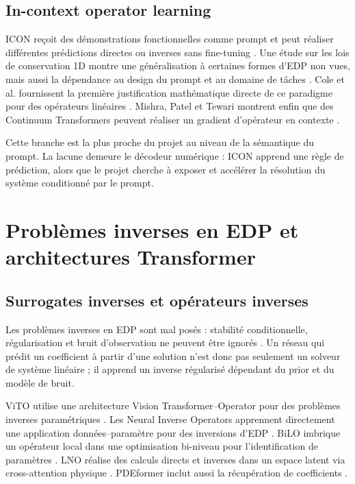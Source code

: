 \documentclass[11pt,a4paper]{article}
\begin{document}
\subsection{In-context operator learning}

ICON reçoit des démonstrations fonctionnelles comme prompt et peut réaliser
différentes prédictions directes ou inverses sans fine-tuning
\cite{yang2023icon}. Une étude sur les lois de conservation 1D montre une
généralisation à certaines formes d'EDP non vues, mais aussi la dépendance au
design du prompt et au domaine de tâches \cite{yang2024icongeneralization}.
Cole et al. fournissent la première justification mathématique directe de ce
paradigme pour des opérateurs linéaires \cite{cole2025systems}. Mishra, Patel et
Tewari montrent enfin que des Continuum Transformers peuvent réaliser un
gradient d'opérateur en contexte \cite{mishra2025continuum}.

Cette branche est la plus proche du projet au niveau de la sémantique du
prompt. La lacune demeure le décodeur numérique : ICON apprend une règle de
prédiction, alors que le projet cherche à exposer et accélérer la résolution du
système conditionné par le prompt.

\section{Problèmes inverses en EDP et architectures Transformer}

\subsection{Surrogates inverses et opérateurs inverses}

Les problèmes inverses en EDP sont mal posés : stabilité conditionnelle,
régularisation et bruit d'observation ne peuvent être ignorés
\cite{engl1996inverse,stuart2010bayesian}. Un réseau qui prédit un coefficient
à partir d'une solution n'est donc pas seulement un solveur de système
linéaire ; il apprend un inverse régularisé dépendant du prior et du modèle de
bruit.

ViTO utilise une architecture Vision Transformer--Operator pour des problèmes
inverses paramétriques \cite{ovadia2023vito}. Les Neural Inverse Operators
apprennent directement une application données--paramètre pour des inversions
d'EDP \cite{molinaro2023nio}. BiLO imbrique un opérateur local dans une
optimisation bi-niveau pour l'identification de paramètres
\cite{cao2024bilo}. LNO réalise des calculs directs et inverses dans un espace
latent via cross-attention physique \cite{wang2024lno}. PDEformer inclut aussi
la récupération de coefficients \cite{ye2024pdeformer}.
\end{document}
